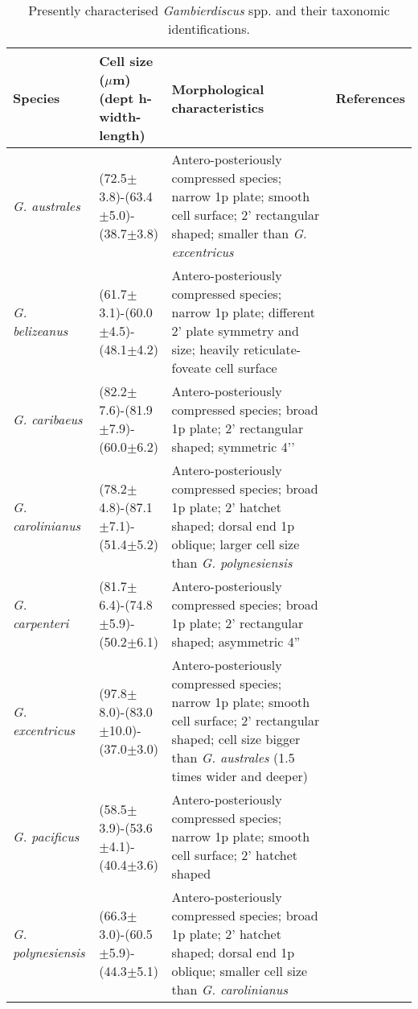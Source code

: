 \documentclass[12pt]{article}
\begin{document}
\begin{longtable}{ |  p{1.6cm} | p{3.2cm} | p{6.7cm} |  p{2.5cm} | }
\caption{Presently characterised \emph{Gambierdiscus} spp. and their taxonomic identifications.}\\
\hline
\label{tbl:MorphTable}
\textbf{Species} & \textbf{Cell size ($\mu$m) (dept h-width-length)} & \textbf{Morphological characteristics} & \textbf{References} \\
\hline
 \emph{G. australes} & (72.5$\pm$3.8)-(63.4$\pm$5.0)-(38.7$\pm$3.8) & Antero-posteriously compressed species; narrow 1p plate; smooth cell surface; 2' rectangular shaped; smaller than \emph{G. excentricus} &  \cite{chinain1999morphology,litaker2009taxonomy} \\
\hline
 \emph{G. belizeanus} & (61.7$\pm$3.1)-(60.0$\pm$4.5)-(48.1$\pm$4.2) & Antero-posteriously compressed species; narrow 1p plate; different 2' plate symmetry and size; heavily reticulate-foveate cell surface & \cite{litaker2009taxonomy,faust1995observation} \\
\hline
 \emph{G. caribaeus} & (82.2$\pm$7.6)-(81.9$\pm$7.9)-(60.0$\pm$6.2) & Antero-posteriously compressed species; broad 1p plate; 2’ rectangular shaped; symmetric 4’’  & \cite{litaker2009taxonomy} \\
\hline
 \emph{G. carolinianus} & (78.2$\pm$4.8)-(87.1$\pm$7.1)-(51.4$\pm$5.2) & Antero-posteriously compressed species; broad 1p plate; 2’ hatchet shaped; dorsal end 1p oblique; larger cell size than \emph{G. polynesiensis}  & \cite{litaker2009taxonomy} \\
\hline
 \emph{G. carpenteri} & (81.7$\pm$6.4)-(74.8$\pm$5.9)-(50.2$\pm$6.1) & Antero-posteriously compressed species; broad 1p plate; 2’ rectangular shaped; asymmetric 4''   & \cite{litaker2009taxonomy} \\
\hline
  \emph{G. excentricus} & (97.8$\pm$8.0)-(83.0$\pm$10.0)-(37.0$\pm$3.0) & Antero-posteriously compressed species; narrow 1p plate; smooth cell surface; 2’ rectangular shaped; cell size bigger than \emph{G. australes} (1.5 times wider and deeper)   & \cite{litaker2009taxonomy} \\
\hline
  \emph{G. pacificus} & (58.5$\pm$3.9)-(53.6$\pm$4.1)-(40.4$\pm$3.6) & Antero-posteriously compressed species; narrow 1p plate; smooth cell surface; 2' hatchet shaped   & \cite{litaker2009taxonomy,chinain1999morphology} \\
\hline
 \emph{G. polynesiensis} & (66.3$\pm$3.0)-(60.5$\pm$5.9)-(44.3$\pm$5.1) & Antero-posteriously compressed species; broad 1p plate; 2’ hatchet shaped; dorsal end 1p oblique; smaller cell size than \emph{G. carolinianus}   & \cite{litaker2009taxonomy,chinain1999morphology} \\

\end{longtable}
\end{document}
